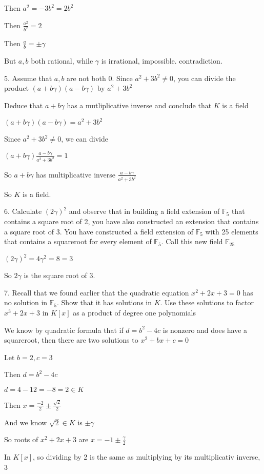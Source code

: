 \documentclass[12pt]{article}
\begin{document}
\begin{itemize}
	Then $a^2 = -3b^2 = 2b^2$

	Then $\frac{a^2}{b^2} = 2$

	Then $\frac{a}{b} = \pm \gamma$

	But $a,b$ both rational, while $\gamma$ is irrational, impossible. contradiction.

 	5. Assume that $a,b$ are not both 0. Since $a^2 + 3b^2 \neq 0$, you can divide the product $(a + b\gamma)(a-b\gamma)$ by $a^2 + 3b^2$

	Deduce that $a+b\gamma$ has a mutliplicative inverse and conclude that $K$ is a field

	$(a+b\gamma)(a-b\gamma) = a^2 + 3b^2$

	Since $a^2 + 3b^2 \neq 0$, we can divide

	$(a+b\gamma)\frac{a-b\gamma}{a^2 + 3b^2} = 1$

	So $a+b\gamma$ has multiplicative inverse $\frac{a-b\gamma}{a^2 + 3b^2}$

	So $K$ is a field.

	6. Calculate $(2\gamma)^2$ and observe that in building a field extension of $\mathbb{F}_5$ that contains a square root of 2, you have also constructed an extension that contains a square root of 3. You have constructed a field extension of $\mathbb{F}_5$ with 25 elements that contains a squareroot for every element of $\mathbb{F}_5$. Call this new field $\mathbb{F}_{25}$

	$(2\gamma)^2 = 4\gamma^2 = 8 = 3$

	So $2\gamma$ is the square root of 3.

	7. Recall that we found earlier that the quadratic equation $x^2 + 2x + 3 = 0$ has no solution in $\mathbb{F}_5$. Show that it has solutions in $K$. Use these solutions to factor $x^3 + 2x + 3$ in $K[x]$ as a product of degree one polynomials

	We know by quadratic formula that if $d = b^2 - 4c$ is nonzero and does have a squareroot, then there are two solutions to $x^2 + bx + c = 0$

	Let $b = 2, c = 3$

	Then $d = b^2 - 4c$

	$d = 4 - 12 = -8 = 2 \in K$

	Then $x = \frac{-2}{2} \pm \frac{\sqrt{2}}{2}$

	And we know $\sqrt{2} \in K$ is $\pm\gamma$

	So roots of $x^2 + 2x + 3$ are $x = -1 \pm \frac{\gamma}{2}$

	In $K[x]$, so dividing by 2 is the same as multiplying by its multiplicativ inverse, 3


\end{itemize}
\end{document}

